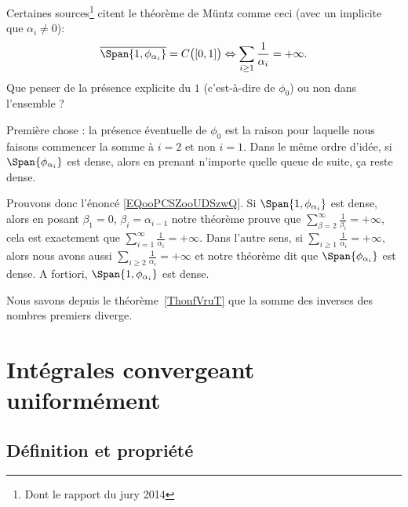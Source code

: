 \begin{remark}      \label{REMooGPYYooCQJwFa}
    Certaines sources\footnote{Dont le rapport du jury 2014} citent le théorème de Müntz comme ceci (avec un implicite que \( \alpha_i\neq 0\)):
    \begin{equation}        \label{EQooPCSZooUDSzwQ}
        \overline{ \Span\{1, \phi_{\alpha_i} \} }=C\big( \mathopen[ 0 , 1 \mathclose] \big) \Leftrightarrow \sum_{i\geq 1}\frac{1}{ \alpha_i }=+\infty.
    \end{equation}
    Que penser de la présence explicite du \( 1\) (c'est-à-dire de \( \phi_0\)) ou non dans l'ensemble ?

    Première chose : la présence éventuelle de \( \phi_0\) est la raison pour laquelle nous faisons commencer la somme à \( i=2\) et non \( i=1\). Dans le même ordre d'idée, si $\Span\{ \phi_{\alpha_i} \}$  est dense, alors en prenant n'importe quelle queue de suite, ça reste dense.

    Prouvons donc l'énoncé \eqref{EQooPCSZooUDSzwQ}. Si \( \Span\{ 1,\phi_{\alpha_i} \}\) est dense, alors en posant \( \beta_1=0\), \( \beta_i=\alpha_{i-1}\) notre théorème prouve que \( \sum_{\beta=2}^{\infty}\frac{1}{ \beta_i }=+\infty\), cela est exactement que \( \sum_{i=1}^{\infty}\frac{1}{ \alpha_i }=+\infty\). Dans l'autre sens, si \( \sum_{i\geq 1}\frac{1}{ \alpha_i }=+\infty\), alors nous avons aussi \( \sum_{i\geq 2}\frac{1}{ \alpha_i }=+\infty\) et notre théorème dit que \( \Span \{ \phi_{\alpha_i} \}\) est dense. A fortiori, \( \Span\{ 1,\phi_{\alpha_i} \}\) est dense.
\end{remark}

\begin{example}
    Nous savons depuis le théorème~\ref{ThonfVruT} que la somme des inverses des nombres premiers diverge.
\end{example}

\section{Intégrales convergeant uniformément}

\subsection{Définition et propriété}

